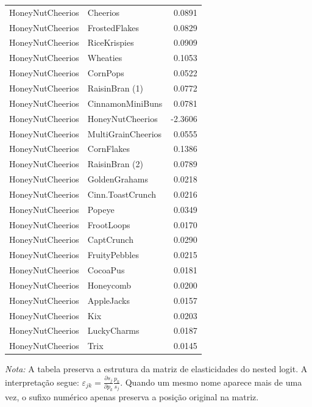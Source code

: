 \begin{table}[H]
\begin{tabular}{llr}
HoneyNutCheerios & Cheerios & 0.0891 \\
HoneyNutCheerios & FrostedFlakes & 0.0829 \\
HoneyNutCheerios & RiceKrispies & 0.0909 \\
HoneyNutCheerios & Wheaties & 0.1053 \\
HoneyNutCheerios & CornPops & 0.0522 \\
HoneyNutCheerios & RaisinBran (1) & 0.0772 \\
HoneyNutCheerios & CinnamonMiniBuns & 0.0781 \\
HoneyNutCheerios & HoneyNutCheerios & -2.3606 \\
HoneyNutCheerios & MultiGrainCheerios & 0.0555 \\
HoneyNutCheerios & CornFlakes & 0.1386 \\
HoneyNutCheerios & RaisinBran (2) & 0.0789 \\
HoneyNutCheerios & GoldenGrahams & 0.0218 \\
HoneyNutCheerios & Cinn.ToastCrunch & 0.0216 \\
HoneyNutCheerios & Popeye & 0.0349 \\
HoneyNutCheerios & FrootLoops & 0.0170 \\
HoneyNutCheerios & CaptCrunch & 0.0290 \\
HoneyNutCheerios & FruityPebbles & 0.0215 \\
HoneyNutCheerios & CocoaPus & 0.0181 \\
HoneyNutCheerios & Honeycomb & 0.0200 \\
HoneyNutCheerios & AppleJacks & 0.0157 \\
HoneyNutCheerios & Kix & 0.0203 \\
HoneyNutCheerios & LuckyCharms & 0.0187 \\
HoneyNutCheerios & Trix & 0.0145 \\
\bottomrule
\end{tabular}

\vspace{0.3em}
\footnotesize
\textit{Nota:} A tabela preserva a estrutura da matriz de elasticidades do nested logit. A interpretação segue: $\varepsilon_{jk}=\frac{\partial s_j}{\partial p_k}\frac{p_k}{s_j}$. Quando um mesmo nome aparece mais de uma vez, o sufixo numérico apenas preserva a posição original na matriz.
\end{table}
\endgroup


